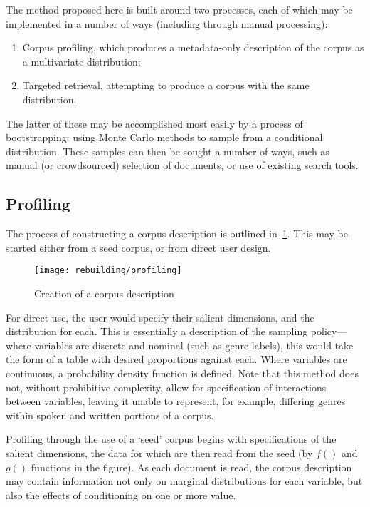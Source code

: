 
The method proposed here is built around two processes, each of which may be implemented in a number of ways (including through manual processing):

\begin{enumerate}
    \item Corpus profiling, which produces a metadata-only description of the corpus as a multivariate distribution;
    \item Targeted retrieval, attempting to produce a corpus with the same distribution.
\end{enumerate}

The latter of these may be accomplished most easily by a process of bootstrapping: using Monte Carlo methods to sample from a conditional distribution.  These samples can then be sought a number of ways, such as manual (or crowdsourced) selection of documents, or use of existing search tools.

\subsection{Profiling}
The process of constructing a corpus description is outlined in~\ref{fig:rebuilding:profiling}.  This may be started either from a seed corpus, or from direct user design.

\begin{figure}[h]
    \centering
    \texttt{[image: rebuilding/profiling]}
    \caption{Creation of a corpus description}
    \label{fig:rebuilding:profiling}
\end{figure}


For direct use, the user would specify their salient dimensions, and the distribution for each.  This is essentially a description of the sampling policy---where variables are discrete and nominal (such as genre labels), this would take the form of a table with desired proportions against each.  Where variables are continuous, a probability density function is defined.  Note that this method does not, without prohibitive complexity, allow for specification of interactions between variables, leaving it unable to represent, for example, differing genres within spoken and written portions of a corpus.

Profiling through the use of a `seed' corpus begins with specifications of the salient dimensions, the data for which are then read from the seed (by $f()$ and $g()$ functions in the figure).  As each document is read, the corpus description may contain information not only on marginal distributions for each variable, but also the effects of conditioning on one or more value.


